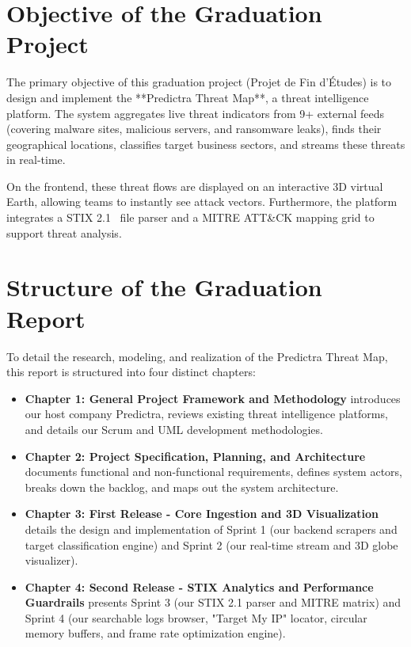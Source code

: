 \section*{Objective of the Graduation Project}
The primary objective of this graduation project (Projet de Fin d'Études) is to design and implement the **Predictra Threat Map**, a threat intelligence platform. The system aggregates live threat indicators from 9+ external feeds (covering malware sites, malicious servers, and ransomware leaks), finds their geographical locations, classifies target business sectors, and streams these threats in real-time.

On the frontend, these threat flows are displayed on an interactive 3D virtual Earth, allowing teams to instantly see attack vectors. Furthermore, the platform integrates a STIX 2.1~\cite{stix_specification} file parser and a MITRE ATT\&CK mapping grid to support threat analysis.

\section*{Structure of the Graduation Report}
To detail the research, modeling, and realization of the Predictra Threat Map, this report is structured into four distinct chapters:
\begin{itemize}
    \item \textbf{Chapter 1: General Project Framework and Methodology} introduces our host company Predictra, reviews existing threat intelligence platforms, and details our Scrum and UML development methodologies.
    \item \textbf{Chapter 2: Project Specification, Planning, and Architecture} documents functional and non-functional requirements, defines system actors, breaks down the backlog, and maps out the system architecture.
    \item \textbf{Chapter 3: First Release - Core Ingestion and 3D Visualization} details the design and implementation of Sprint 1 (our backend scrapers and target classification engine) and Sprint 2 (our real-time stream and 3D globe visualizer).
    \item \textbf{Chapter 4: Second Release - STIX Analytics and Performance Guardrails} presents Sprint 3 (our STIX 2.1 parser and MITRE matrix) and Sprint 4 (our searchable logs browser, "Target My IP" locator, circular memory buffers, and frame rate optimization engine).
\end{itemize}
